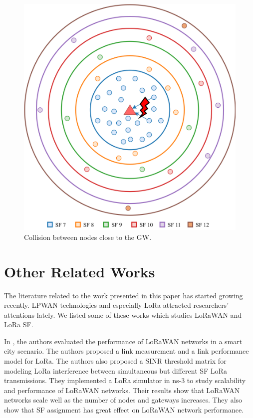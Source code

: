 \documentclass[conference]{IEEEtran}
\begin{document}
\begin{figure}
\centering
\includegraphics[width=\linewidth]{collision}
\caption{Collision between nodes close to the GW.}
\label{fig:collision}
\end{figure}


\section{Other Related Works} \label{Other Related Works}
\par The literature related to the work presented in this paper has started growing recently. LPWAN technologies and especially LoRa attracted researchers’ attentions lately. We listed some of these works which studies LoRaWAN and LoRa SF.

\par In \cite{7996384}, the authors evaluated the performance of LoRaWAN networks in a smart city scenario. The authors proposed a link measurement and a link performance model for LoRa. The authors also proposed a SINR threshold matrix for modeling LoRa interference between simultaneous but different SF LoRa transmissions. They implemented a LoRa simulator in ns-3 to study scalability and performance of LoRaWAN networks. Their results show that LoRaWAN networks scale well as the number of nodes and gateways increases. They also show that SF assignment has great effect on LoRaWAN network performance.
\end{document}
